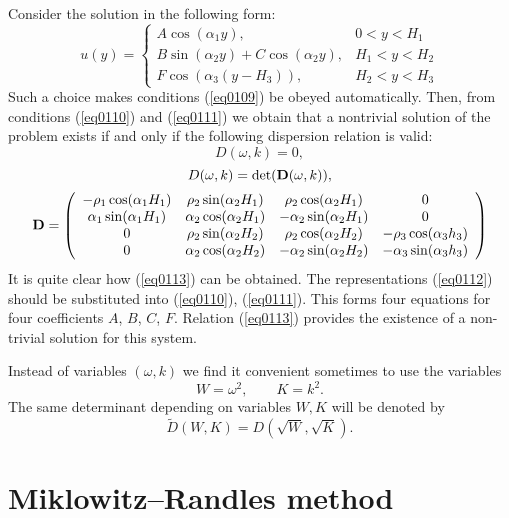 \documentclass[12pt]{article}
\begin{document}
Consider the solution in the following form: 
\begin{equation}
u(y) = \left\{ \begin{array}{ll}
A \cos(\alpha_1 y),                      & 0<y<H_1 \\  
B \sin(\alpha_2 y) + C \cos(\alpha_2 y), & H_1<y<H_2 \\
F \cos(\alpha_3 (y-H_3)),                & H_2<y<H_3
\end{array} \right.
\label{eq0112}
\end{equation}
Such a choice makes conditions (\ref{eq0109}) be obeyed automatically. Then, from conditions 
(\ref{eq0110}) and (\ref{eq0111}) we obtain that a nontrivial solution of the problem exists if and only if the following dispersion relation is valid:
\begin{equation}
D(\omega,k) = 0,
\label{eq0113}
\end{equation}
\[
D(\omega,k) = {\rm det}({\bf D}(\omega, k)),
\]
\begin{equation}
{\bf D} = \left( \begin{array}{cccc}
-\rho_1 \cos (\alpha_1 H_1)  & \rho_2 \sin(\alpha_2 H_1) & \rho_2 \cos (\alpha_2 H_1) & 0  \\
\alpha_1 \sin (\alpha_1 H_1) & \alpha_2 \cos(\alpha_2 H_1) & -\alpha_2 \sin (\alpha_2 H_1) & 0  \\
0 & \rho_2 \sin (\alpha_2 H_2) & \rho_2 \cos(\alpha_2 H_2) & - \rho_3 \cos (\alpha_3 h_3) \\
0 & \alpha_2 \cos (\alpha_2 H_2) & 
-\alpha_2 \sin(\alpha_2 H_2) &  -\alpha_3 \sin (\alpha_3 h_3) 
\end{array} \right)
\label{eq0114}
\end{equation}
It is quite clear how (\ref{eq0113}) can be obtained. The representations (\ref{eq0112})
should be substituted into (\ref{eq0110}), (\ref{eq0111}). This forms four equations for four 
coefficients $A$, $B$, $C$, $F$. Relation (\ref{eq0113}) provides the existence of a non-trivial 
solution for this system. 

Instead of variables $(\omega, k)$ we find it convenient sometimes to use the variables 
\[
W = \omega^2, 
\qquad
K = k^2.
\]
The same determinant depending on variables $W,K$ will be denoted by 
\[
\tilde D (W,K) = D(\sqrt{W}, \sqrt{K}).
\]



\section{Miklowitz--Randles method}
\label{sec_miklowitz}
\end{document}
